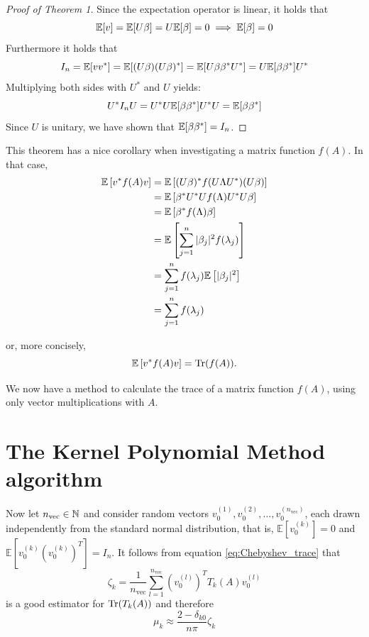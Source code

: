 \begin{proof}[Proof of Theorem 1]
    Since the expectation operator is linear, it holds that
    \[
    \mathbb{E}[v] = \mathbb{E}[U\beta] = U\mathbb{E}[\beta] = 0 \implies \mathbb{E}[\beta] = 0
    \]
    Furthermore it holds that
    \[
    I_n = \mathbb{E}[vv^*] = \mathbb{E}[(U\beta)(U\beta)^*] = \mathbb{E}[U\beta \beta^*U^*] = U \mathbb{E}[\beta \beta^*]U^*
    \]
    Multiplying both sides with $U^*$ and $U$ yields:
    \[
    U^* I_n U = U^* U \mathbb{E}[\beta \beta^*]U^* U = \mathbb{E}[\beta \beta^*]
    \]
    Since $U$ is unitary, we have shown that $\mathbb{E}[\beta \beta^*] = I_n$.
\end{proof}

This theorem has a nice corollary when investigating a matrix function $f(A)$.
In that case,
\begin{align*}
    \mathbb{E}\left[v^* f(A) v\right] &= \mathbb{E}\left[(U\beta)^* f(U\Lambda U^*) (U\beta)\right] \\
        &= \mathbb{E}\left[\beta^* U^* U f(\Lambda) U^* U \beta\right] \\
        &= \mathbb{E}\left[\beta^* f(\Lambda) \beta\right] \\
        &= \mathbb{E}\left[\sum_{j = 1}^n |\beta_j|^2 f(\lambda_j) \right] \\
        &= \sum_{j = 1}^n f(\lambda_j) \mathbb{E}\left[ |\beta_j|^2 \right] \\
        &= \sum_{j = 1}^n f(\lambda_j)
\end{align*}

or, more concisely,
\begin{equation} \label{eq:Chebyshev_trace}
    \mathbb{E}\left[v^* f(A) v\right] = \operatorname{Tr}(f(A)).
\end{equation}

We now have a method to calculate the trace of a matrix function $f(A)$,
using only vector multiplications with $A$.

\section{The Kernel Polynomial Method algorithm}

Now let $n_{\text{vec}} \in \mathbb{N}$ and consider random vectors $v_0^{(1)}, v_0^{(2)}, \dots, v_0^{(n_{\text{vec}})}$,
each drawn independently from the standard normal distribution, that is, $\mathbb{E}[v_0^{(k)}] = 0$ and $\mathbb{E}\left[v_0^{(k)} \left(v_0^{(k)}\right)^T\right] = I_n$.
It follows from equation \ref{eq:Chebyshev_trace} that
\[
\zeta_k = \frac{1}{n_{\text{vec}}} \sum_{l = 1}^{n_{\text{vec}}} \left( v_0^{(l)} \right)^T T_k(A) v_0^{(l)}
\]
is a good estimator for $\operatorname{Tr}(T_k(A))$ and therefore
\[
\mu_k \approx \frac{2 - \delta_{k0}}{n \pi} \zeta_k
\]

